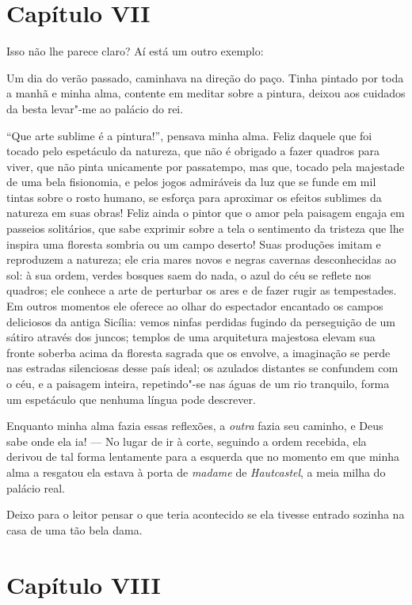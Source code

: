 \section*{Capítulo VII}

 Isso não lhe parece claro? Aí está um outro exemplo:

 Um dia do verão passado, caminhava na direção do paço. Tinha pintado
por toda a manhã e minha alma, contente em meditar sobre a pintura,
deixou aos cuidados da besta levar"-me ao palácio do rei.

 ``Que arte sublime é a pintura!'', pensava minha alma. Feliz daquele que
foi tocado pelo espetáculo da natureza, que não é obrigado a fazer
quadros para viver, que não pinta unicamente por passatempo, mas que,
tocado pela majestade de uma bela fisionomia, e pelos jogos admiráveis
da luz que se funde em mil tintas sobre o rosto humano, se esforça para
aproximar os efeitos sublimes da natureza em suas obras! Feliz ainda o
pintor que o amor pela paisagem engaja em passeios solitários, que sabe
exprimir sobre a tela o sentimento da tristeza que lhe inspira uma
floresta sombria ou um campo deserto! Suas produções imitam e
reproduzem a natureza; ele cria mares novos e negras cavernas
desconhecidas ao sol: à sua ordem, verdes bosques saem do nada, o azul
do céu se reflete nos quadros; ele conhece a arte de perturbar os ares
e de fazer rugir as tempestades. Em outros momentos ele oferece ao
olhar do espectador encantado os campos deliciosos da antiga Sicília:
vemos ninfas perdidas fugindo da perseguição de um sátiro através dos
juncos; templos de uma arquitetura majestosa elevam sua fronte soberba
acima da floresta sagrada que os envolve, a imaginação se perde nas
estradas silenciosas desse país ideal; os azulados distantes se
confundem com o céu, e a paisagem inteira, repetindo"-se nas águas de um
rio tranquilo, forma um espetáculo que nenhuma língua pode descrever.

 Enquanto minha alma fazia essas reflexões, a \textit{outra} fazia seu
caminho, e Deus sabe onde ela ia! --- No lugar de ir à corte, seguindo
a ordem recebida, ela derivou de tal forma lentamente para a esquerda
que no momento em que minha alma a resgatou ela estava à porta de
\textit{madame} de \textit{Hautcastel}, a meia milha do palácio real.

 Deixo para o leitor pensar o que teria acontecido se ela tivesse
entrado sozinha na casa de uma tão bela dama. 

\section*{Capítulo VIII}

